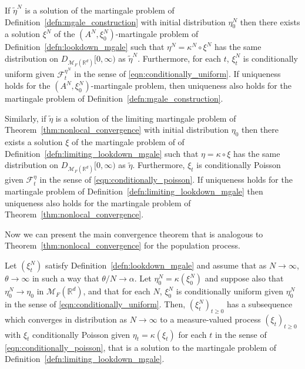 \documentclass[EJP]{ejpecp} %
\renewcommand{\tilde}{\widetilde}
\newcommand{\IR}{\mathbb R}
\newcommand{\lp}{\xi}              %
\newcommand{\measures}{\mathcal{M}_F(\IR^d)} %
\begin{document}
\begin{proposition}
    \label{thm:mmt_application}
    If $\tilde \eta^N$ is a solution
    of the martingale problem of Definition~\ref{defn:mgale_construction}
    with initial distribution $\eta^N_0$
    then there exists a solution $\lp^N$
    of the $(A^N, \lp^N_0)$-martingale problem of Definition~\ref{defn:lookdown_mgale}
    such that $\eta^N = \kappa^N \circ \lp^N$
    has the same distribution on $D_{\measures}[0, \infty)$
    as $\tilde \eta^N$.
    Furthermore, for each $t$, $\lp^N_t$ is conditionally uniform 
	given $\mathcal{F}^{\eta^N}_t$
    in the sense of \eqref{eqn:conditionally_uniform}.
    If uniqueness holds for the $(A^N, \lp^N_0)$-martingale problem,
    then uniqueness also holds
    for the martingale problem of Definition~\ref{defn:mgale_construction}.

    Similarly,
    if $\tilde \eta$ is a solution
    of the limiting martingale problem of Theorem~\ref{thm:nonlocal_convergence}
    with initial distribution $\eta_0$
    then there exists a solution $\lp$
    of the martingale problem of of Definition~\ref{defn:limiting_lookdown_mgale}
    such that $\eta = \kappa \circ \lp$
    has the same distribution on $D_{\measures}[0, \infty)$
    as $\tilde \eta$.
    Furthermore, $\lp_t$ is conditionally Poisson given $\mathcal{F}^{\eta}_t$
    in the sense of \eqref{eqn:conditionally_poisson}.
    If uniqueness holds
    for the martingale problem of Definition~\ref{defn:limiting_lookdown_mgale}
    then uniqueness also holds for 
    the martingale problem of Theorem~\ref{thm:nonlocal_convergence}.
\end{proposition}

Now we can present the main convergence theorem that is analogous
to Theorem~\ref{thm:nonlocal_convergence} for the population process.

\begin{theorem}
    \label{thm:lookdown_convergence}
    Let $(\lp_t^N)$ satisfy Definition~\ref{defn:lookdown_mgale}
    and assume that as $N \to \infty$,
    $\theta \to \infty$ in such a way that $\theta/N \to \alpha$.
    Let $\eta_0^N = \kappa(\lp_0^N)$ and
    suppose also that $\eta^N_0 \to \eta_0$ in $\measures$,
    and that for each $N$, $\lp^N_0$ is conditionally uniform given $\eta_0^N$
    in the sense of \eqref{eqn:conditionally_uniform}.
    Then, $(\lp_t^N)_{t \ge 0}$ has a subsequence which converges in distribution as $N \to \infty$
    to a measure-valued process $(\lp_t)_{t \ge 0}$
    with $\lp_t$ conditionally Poisson given $\eta_t = \kappa(\lp_t)$ for each $t$
    in the sense of \eqref{eqn:conditionally_poisson},
    that is a solution to the martingale problem of Definition~\ref{defn:limiting_lookdown_mgale}.
\end{theorem}
\end{document}

